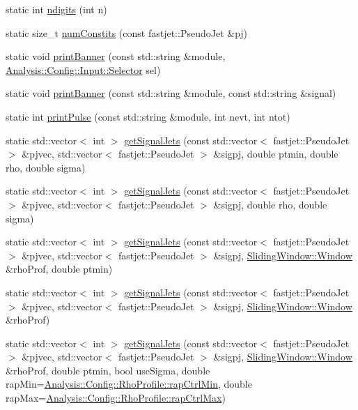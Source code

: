 \begin{DoxyCompactItemize}
\item 
static int \hyperlink{structAnalysisHelper_a606fb197c293e08f782e4f63bfd72e86}{ndigits} (int n)
\item 
static size\+\_\+t \hyperlink{structAnalysisHelper_ae90a02cc4c75381b3f4f89a11d3d8086}{num\+Constits} (const fastjet\+::\+Pseudo\+Jet \&pj)
\item 
static void \hyperlink{structAnalysisHelper_af0d142b1a86984f4f91ee8fe305a6223}{print\+Banner} (const std\+::string \&module, \hyperlink{namespaceAnalysis_1_1Config_1_1Input_a4fbe1ba2d37856e6b9784b4999d5268a}{Analysis\+::\+Config\+::\+Input\+::\+Selector} sel)
\item 
static void \hyperlink{structAnalysisHelper_a83df30344dbb309403b9010f6bf785b0}{print\+Banner} (const std\+::string \&module, const std\+::string \&signal)
\item 
static int \hyperlink{structAnalysisHelper_ab8c81f26a5c90ec94349606e30be0bbc}{print\+Pulse} (const std\+::string \&module, int nevt, int ntot)
\item 
static std\+::vector$<$ int $>$ \hyperlink{structAnalysisHelper_ac5e8954f898f2e9f131239bf9ba5b120}{get\+Signal\+Jets} (const std\+::vector$<$ fastjet\+::\+Pseudo\+Jet $>$ \&pjvec, std\+::vector$<$ fastjet\+::\+Pseudo\+Jet $>$ \&sigpj, double ptmin, double rho, double sigma)
\item 
static std\+::vector$<$ int $>$ \hyperlink{structAnalysisHelper_ad2424142d8b7535bc84f3818b29f572b}{get\+Signal\+Jets} (const std\+::vector$<$ fastjet\+::\+Pseudo\+Jet $>$ \&pjvec, std\+::vector$<$ fastjet\+::\+Pseudo\+Jet $>$ \&sigpj, double rho, double sigma)
\item 
static std\+::vector$<$ int $>$ \hyperlink{structAnalysisHelper_a7815615d415341f476c0c94547186d04}{get\+Signal\+Jets} (const std\+::vector$<$ fastjet\+::\+Pseudo\+Jet $>$ \&pjvec, std\+::vector$<$ fastjet\+::\+Pseudo\+Jet $>$ \&sigpj, \hyperlink{classSlidingWindow_1_1Window}{Sliding\+Window\+::\+Window} \&rho\+Prof, double ptmin)
\item 
static std\+::vector$<$ int $>$ \hyperlink{structAnalysisHelper_a74b9a8522485671658a2ce7e41335234}{get\+Signal\+Jets} (const std\+::vector$<$ fastjet\+::\+Pseudo\+Jet $>$ \&pjvec, std\+::vector$<$ fastjet\+::\+Pseudo\+Jet $>$ \&sigpj, \hyperlink{classSlidingWindow_1_1Window}{Sliding\+Window\+::\+Window} \&rho\+Prof)
\item 
static std\+::vector$<$ int $>$ \hyperlink{structAnalysisHelper_afd6b9f18847c6e0d1848b16807caebb1}{get\+Signal\+Jets} (const std\+::vector$<$ fastjet\+::\+Pseudo\+Jet $>$ \&pjvec, std\+::vector$<$ fastjet\+::\+Pseudo\+Jet $>$ \&sigpj, \hyperlink{classSlidingWindow_1_1Window}{Sliding\+Window\+::\+Window} \&rho\+Prof, double ptmin, bool use\+Sigma, double rap\+Min=\hyperlink{namespaceAnalysis_1_1Config_1_1RhoProfile_a6a12ebe70b6648825eead16dff1159fd}{Analysis\+::\+Config\+::\+Rho\+Profile\+::rap\+Ctrl\+Min}, double rap\+Max=\hyperlink{namespaceAnalysis_1_1Config_1_1RhoProfile_ab78a2585916e0761da7090b86d5c762b}{Analysis\+::\+Config\+::\+Rho\+Profile\+::rap\+Ctrl\+Max})

\end{DoxyCompactItemize}
